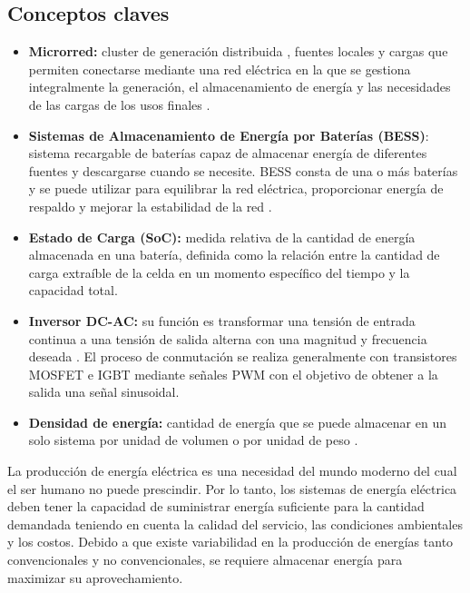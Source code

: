 \subsection{Conceptos claves}
\begin{itemize}
    \item \textbf{Microrred:} cluster de generación distribuida , fuentes locales y cargas que permiten conectarse mediante una red eléctrica en la que se gestiona integralmente la generación, el almacenamiento de energía y las necesidades de las cargas de los usos finales \cite{microgrid}.
    \item \textbf{Sistemas de Almacenamiento de Energía por Baterías (BESS)}: sistema recargable de baterías capaz de almacenar energía de diferentes fuentes y descargarse cuando se necesite. BESS consta de una o más baterías y se puede utilizar para equilibrar la red eléctrica, proporcionar energía de respaldo y mejorar la estabilidad de la red \cite{siemens}.
    \item  \textbf{Estado de Carga (SoC):} medida relativa de la cantidad de energía almacenada en una batería, definida como la relación entre la cantidad de carga extraíble de la celda en un momento específico del tiempo y la capacidad total.
    \item \textbf{Inversor DC-AC:} su función es transformar una tensión de entrada continua a una tensión de salida alterna con una magnitud y frecuencia deseada \cite{rashid-inversor}. El proceso de conmutación se realiza generalmente con transistores MOSFET e IGBT mediante señales PWM con el objetivo de obtener a la salida una señal sinusoidal.
    \item \textbf{Densidad de energía:} cantidad de energía que se puede almacenar en un solo sistema por unidad de volumen o por unidad de peso \cite{densidad}.
\end{itemize}

\newpage
La producción de energía eléctrica es una necesidad del mundo moderno del cual el ser humano no puede prescindir. Por lo tanto, los sistemas de energía eléctrica deben tener la capacidad de suministrar energía suficiente para la cantidad demandada teniendo en cuenta la calidad del servicio, las condiciones ambientales y los costos. Debido a que existe variabilidad en la producción de energías tanto  convencionales y no convencionales, se requiere almacenar energía para maximizar su aprovechamiento. 


